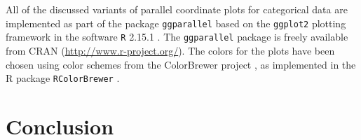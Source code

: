 All  of the discussed variants of parallel coordinate plots for categorical data are implemented as part of the package {\tt ggparallel} based on the {\tt ggplot2} \cite{ggplot2} plotting framework in the software {\tt R} 2.15.1 \citep{R}. The  {\tt ggparallel} package is freely available from CRAN (\url{http://www.r-project.org/}).
The colors for the plots have been chosen using color schemes from the ColorBrewer project  \cite{colorbrewer} , as implemented in the R package {\tt RColorBrewer}  \cite{RColorBrewer} .


\section{Conclusion}






%

